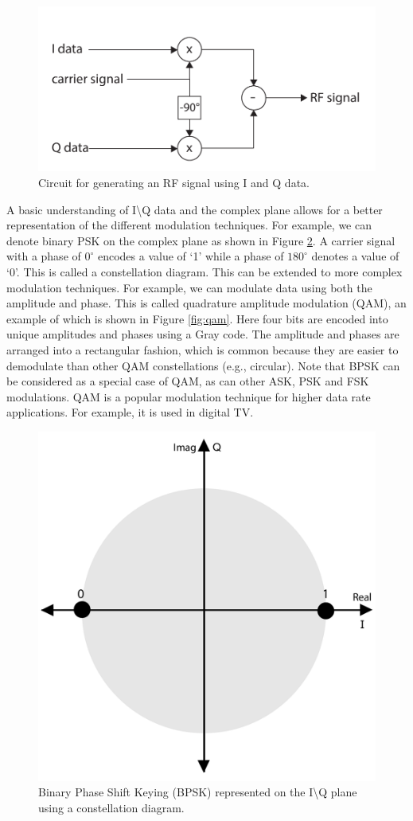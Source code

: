 \begin{figure}
\centering
\includegraphics[width=.5\textwidth]{images/IQcircuit}
\caption{Circuit for generating an RF signal using I and Q data.}
\label{fig:IQcircuit}
\end{figure}

A basic understanding of I\textbackslash{}Q data and the complex plane allows for a better representation of the different modulation techniques. For example, we can denote binary PSK on the complex plane as shown in Figure \ref{fig:bpsk}. A carrier signal with a phase of $0^{\circ}$ encodes a value of `1' while a phase of $180^{\circ}$ denotes a value of `0'.  This is called a constellation diagram. This can be extended to more complex modulation techniques. For example, we can modulate data using both the amplitude and phase. This is called quadrature amplitude modulation (QAM), an example of which is shown in Figure \ref{fig:qam}. Here four bits are encoded into unique amplitudes and phases using a Gray code. The amplitude and phases are arranged into a rectangular fashion, which is common because they are easier to demodulate than other QAM constellations (e.g., circular). Note that BPSK can be considered as a special case of QAM, as can other ASK, PSK and FSK modulations. QAM is a popular modulation technique for higher data rate applications. For example, it is used in digital TV. 


\begin{figure}
\centering
\includegraphics[width=.4\textwidth]{images/bpsk}
\caption{Binary Phase Shift Keying (BPSK) represented on the I\textbackslash{}Q plane using a constellation diagram.}
\label{fig:bpsk}
\end{figure}

